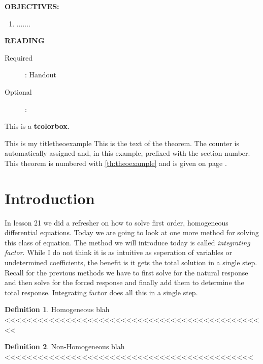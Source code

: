 \documentclass{handout}
\theoremstyle{definition}
\newtheorem{definition}{Definition}[section]
\begin{document}
\maketitle

\textbf{OBJECTIVES:}
\begin{enumerate}
\item .......
\end{enumerate}

\textbf{READING}
\begin{description}
\item [Required]:
Handout

\item [Optional]:
\end{description}

\begin{tcolorbox}[title=My heading line, title filled, rounded corners]
This is a \textbf{tcolorbox}.
\end{tcolorbox}


\begin{mytheo}{This is my title}{theoexample}
  This is the text of the theorem. The counter is automatically assigned and,
  in this example, prefixed with the section number. This theorem is numbered with
  \ref{th:theoexample} and is given on page \pageref{th:theoexample}.
\end{mytheo}

\section{Introduction}
In lesson 21 we did a refresher on how to solve first order, homogeneous differential equations.  Today we are going to look at one more method for solving this class of equation.  The method we will introduce today is called {\em integrating factor}.  While I do not think it is as intuitive as seperation of variables or undetermined coefficients, the benefit is it gets the total solution in a single step.  Recall for the previous methods we have to first solve for the natural response and then solve for the forced response and finally add them to determine the total response.  Integrating factor does all this in a single step.

\theoremstyle{definition}
\begin{definition}{Homogeneous}
	blah <<<<<<<<<<<<<<<<<<<<<<<<<<<<<<<<<<<<<<<<<<<<<<<<
\end{definition}

\theoremstyle{definition}
\begin{definition}{Non-Homogeneous}
	blah <<<<<<<<<<<<<<<<<<<<<<<<<<<<<<<<<<<<<<<<<<<<<
\end{definition}
\end{document}
